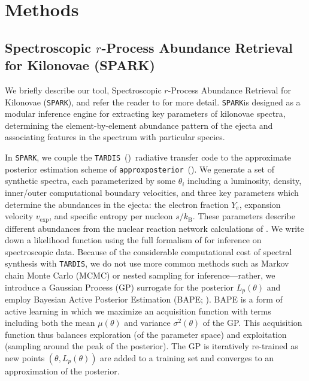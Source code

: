 \documentclass[twocolumn, twocolappendix]{aastex63}
\def\SPARK{\texttt{SPARK}}
\def\TARDIS{\texttt{TARDIS}}
\def\approxposterior{\texttt{approxposterior}}
\begin{document}

\section{Methods}\label{sec:methods}

\subsection{Spectroscopic $r$-Process Abundance Retrieval for Kilonovae (\textsc{SPARK})}\label{ssc:spark-summary}

We briefly describe our tool, Spectroscopic $r$-Process Abundance Retrieval for Kilonovae (\SPARK), and refer the reader to \cite{vieira23} for more detail. \SPARK is designed as a modular inference engine for extracting key parameters of kilonovae spectra, determining the element-by-element abundance pattern of the ejecta and associating features in the spectrum with particular species. 

In \SPARK, we couple the \TARDIS~(\citealt{kerzendorf14})~radiative transfer code to the approximate posterior estimation scheme of \approxposterior~(\citealt{fleming18,fleming20}). We generate a set of synthetic spectra, each parameterized by some $\theta_i$ including a luminosity, density, inner/outer computational boundary velocities, and three key parameters which determine the abundances in the ejecta: the electron fraction $Y_e$, expansion velocity $v_{\mathrm{exp}}$, and specific entropy per nucleon $s / k_{\mathrm{B}}$. These parameters describe different abundances from the nuclear reaction network calculations of \cite{wanajo18}. We write down a likelihood function using the full formalism of \cite{czekala15} for inference on spectroscopic data. Because of the considerable computational cost of spectral synthesis with \TARDIS, we do not use more common methods such as Markov chain Monte Carlo (MCMC) or nested sampling for inference---rather, we introduce a Gaussian Process (GP) surrogate for the posterior $L_p (\theta)$ and employ Bayesian Active Posterior Estimation (BAPE; \citealt{kandasamy17}). BAPE is a form of active learning in which we maximize an acquisition function with terms including both the mean $\mu(\theta)$ and variance $\sigma^2(\theta)$ of the GP. This acquisition function thus balances exploration (of the parameter space) and exploitation (sampling around the peak of the posterior). The GP is iteratively re-trained as new points $(\theta, L_p(\theta))$ are added to a training set and converges to an approximation of the posterior. 
\end{document}
